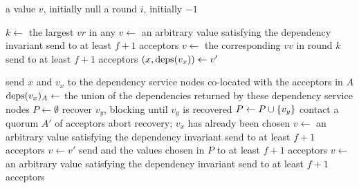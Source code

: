 \newcommand{\nullbot}{\textsf{null}}

\begin{algorithm*}[ht]
  \caption{%
    Majority Commit \BPaxos{} Proposer. Pseudocode for initiating recovery and
    handling  messages is ommitted because it is identical to
    the pseudocode in .
  }%
  \begin{algorithmic}[1]
    \GlobalState a value $v$, initially \nullbot{}
    \GlobalState a round $i$, initially $-1$

      \State $k \gets$ the largest $vr$ in any 
       
        \State $v \gets$ an arbitrary value satisfying the dependency invariant
        \State send  to at least $f + 1$ acceptors
       
        \State $v \gets$ the corresponding $vv$ in round $k$
        \State send  to at least $f + 1$ acceptors
       
        \State $(x, \text{deps}(v_x)) \gets v'$

        \State send $x$ and $v_x$ to the dependency service nodes co-located
               with the acceptors in $A$
        \State $\text{deps}(v_x)_A \gets$ the union of the dependencies returned by
               these dependency service nodes
        \State
        \State $P \gets \emptyset$
            \State recover $v_y$, blocking until $v_y$ is recovered
          \EndIf
            \State $P \gets P \cup \{v_y\}$
          \Else{}
            \State contact a quorum $A'$ of acceptors
              \State abort recovery; $v_x$ has already been chosen
            \Else{}
              \State $v \gets$ an arbitrary value satisfying the dependency invariant
              \State send  to at least $f + 1$ acceptors
            \EndIf{}
          \EndIf{}
        \EndFor{}
        \State $v \gets v'$
        \State send  and the values chosen in $P$ to at
               least $f + 1$ acceptors
      \Else{} 
        \State $v \gets$ an arbitrary value satisfying the dependency invariant
        \State send  to at least $f + 1$ acceptors
      \EndIf
    \EndUpon
  \end{algorithmic}
\end{algorithm*}
